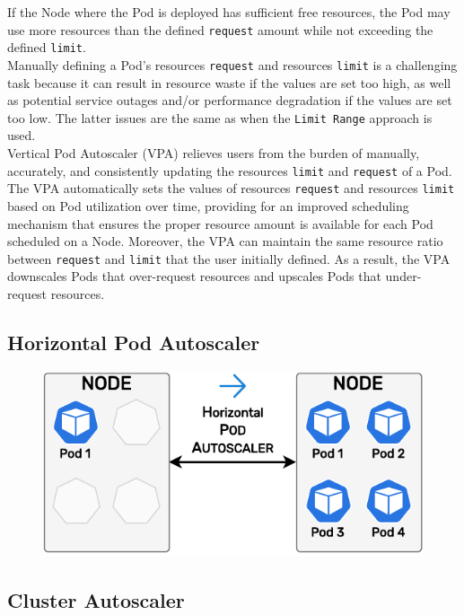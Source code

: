 If the Node where the Pod is deployed has sufficient free resources, the Pod may
use more resources than the defined \texttt{request} amount while not exceeding
the defined \texttt{limit}. \\ %
Manually defining a Pod's resources \texttt{request} and resources \texttt{limit}
is a challenging task because it can result in resource waste if the values are set
too high, as well as potential service outages and/or performance degradation if
the values are set too low. The latter issues are the same as when the \texttt{Limit
Range} approach is used. \\ %
Vertical Pod Autoscaler (VPA) relieves users from the burden of manually, accurately,
and consistently updating the resources \texttt{limit} and \texttt{request} of a
Pod. The VPA automatically sets the values of resources \texttt{request} and
resources \texttt{limit} based on Pod utilization over time, providing for an
improved scheduling mechanism that ensures the proper resource amount is
available for each Pod scheduled on a Node. Moreover, the VPA can maintain the
same resource ratio between \texttt{request} and \texttt{limit} that the user
initially defined. As a result, the VPA downscales Pods that over-request
resources and upscales Pods that under-request resources.

\subsection{Horizontal Pod Autoscaler}
\label{subsec:implementation_autoscaling_horizontal_pod_autoscaler}

\begin{figure}
  \centering
  \includegraphics[width=\linewidth]{
    images/implementation/horizontal_pod_autoscaler.pdf
  }
\end{figure}

\subsection{Cluster Autoscaler}
\label{subsec:implementation_autoscaling_cluster_autoscaler}

